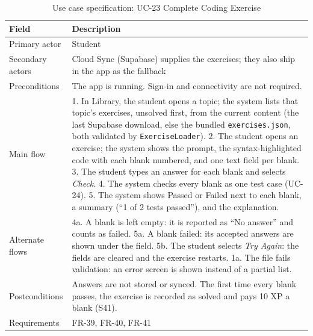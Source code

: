 \documentclass[12pt,letterpaper]{article}
\begin{document}
\begin{table}[H]
\centering
\caption{Use case specification: UC-23 Complete Coding Exercise}
\label{tab:uc23}
\begin{tabularx}{\textwidth}{@{}L{3.0cm} Y@{}}
\toprule
\textbf{Field} & \textbf{Description} \\
\midrule
Primary actor & Student \\
Secondary actors & Cloud Sync (Supabase) supplies the exercises; they also ship in the app as the fallback \\
Preconditions & The app is running. Sign-in and connectivity are not required. \\
Main flow & 1. In Library, the student opens a topic; the system lists that topic's exercises, unsolved first, from the current content (the last Supabase download, else the bundled \texttt{exercises.json}, both validated by \texttt{ExerciseLoader}). 2. The student opens an exercise; the system shows the prompt, the syntax-highlighted code with each blank numbered, and one text field per blank. 3. The student types an answer for each blank and selects \emph{Check}. 4. The system checks every blank as one test case (UC-24). 5. The system shows Passed or Failed next to each blank, a summary (``1 of 2 tests passed''), and the explanation. \\
Alternate flows & 4a. A blank is left empty: it is reported as ``No answer'' and counts as failed. 5a. A blank failed: its accepted answers are shown under the field. 5b. The student selects \emph{Try Again}: the fields are cleared and the exercise restarts. 1a. The file fails validation: an error screen is shown instead of a partial list. \\
Postconditions & Answers are not stored or synced. The first time every blank passes, the exercise is recorded as solved and pays 10 XP a blank (S41). \\
Requirements & FR-39, FR-40, FR-41 \\
\bottomrule
\end{tabularx}
\end{table}
\end{document}

